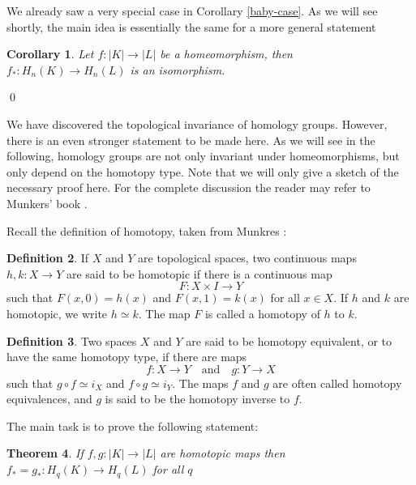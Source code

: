 \documentclass[draft,toc=bib]{scrartcl}
\theoremstyle{plain}
\newtheorem{theorem}{Theorem}[section]
\newtheorem{corollary}[theorem]{Corollary}
\theoremstyle{definition}
\newtheorem	{definition}[theorem]{Definition}
\theoremstyle{remark}
\newcommand{\qandq}{\quad \text{and} \quad}
\begin{document}
We already saw a very special case in Corollary \ref{baby-case}. As we will see shortly, the main idea is essentially the same for a more general statement

\begin{corollary}
	Let $f: |K|\to |L| $ be a homeomorphism, then $f_\ast: H_n(K)\to H_n(L)$ is an isomorphism.
\end{corollary}\qed

We have discovered the topological invariance of homology groups. However, there is an even stronger statement to be made here. As we will see in the following, homology groups are not only invariant under homeomorphisms, but only depend on the homotopy type. Note that we will only give a sketch of the necessary proof here. For the complete discussion the reader may refer to Munkers' book \parencite[\S 19]{mu}.

Recall the definition of homotopy, taken from Munkres \cite[p. 94]{mu}:

\begin{definition}
	If $X$ and $Y$ are topological spaces, two continuous maps $h, k: X\to Y$ are said to be homotopic if there is a continuous map \[
	F: X\times I\to Y
	\]
	such that $F(x,0)=h(x)$ and $F(x,1)=k(x)$ for all $x\in X$. If $h$ and $k$ are homotopic, we write $h\simeq k$. The map $F$ is called a homotopy of $h$ to $k$. 
\end{definition}
\begin{definition}\label{def:hom-eq}
	Two spaces $X$ and $Y$ are said to be homotopy equivalent, or to have the same homotopy type, if there are maps\[
	f: X\to Y\qandq g:Y\to X
	\]
	such that $g\circ f\simeq i_X$ and $f\circ g\simeq i_Y$. The maps $f$ and $g$ are often called homotopy equivalences, and $g$ is said to be the homotopy inverse to $f$.
\end{definition}

The main task is to prove the following statement:
\begin{theorem}\label{homotopy_invariance}
	If $f,g:|K|\to |L|$ are homotopic maps then $f_\ast=g_\ast: H_q(K)\to H_q(L)$ for all $q$
\end{theorem}
\end{document}
